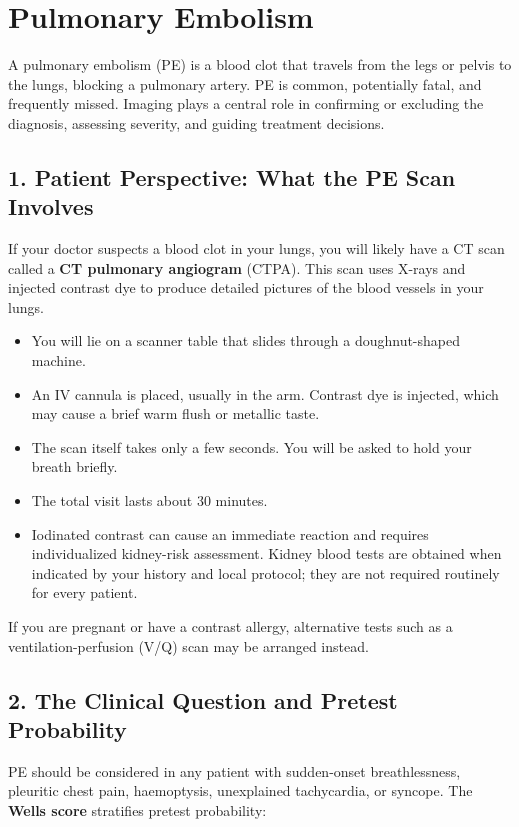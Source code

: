 \chapter{Pulmonary Embolism}

\label{ch:ch73_pulmonary_embolism}

A pulmonary embolism (PE) is a blood clot that travels from the legs or pelvis to the lungs, blocking a pulmonary artery. PE is common, potentially fatal, and frequently missed. Imaging plays a central role in confirming or excluding the diagnosis, assessing severity, and guiding treatment decisions.


\section{1. Patient Perspective: What the PE Scan Involves}

If your doctor suspects a blood clot in your lungs, you will likely have a CT scan called a \textbf{CT pulmonary angiogram} (CTPA). This scan uses X-rays and injected contrast dye to produce detailed pictures of the blood vessels in your lungs.

\begin{itemize}
  \item You will lie on a scanner table that slides through a doughnut-shaped machine.
  \item An IV cannula is placed, usually in the arm. Contrast dye is injected, which may cause a brief warm flush or metallic taste.
  \item The scan itself takes only a few seconds. You will be asked to hold your breath briefly.
  \item The total visit lasts about 30 minutes.
  \item Iodinated contrast can cause an immediate reaction and requires individualized kidney-risk assessment. Kidney blood tests are obtained when indicated by your history and local protocol; they are not required routinely for every patient.
\end{itemize}

If you are pregnant or have a contrast allergy, alternative tests such as a ventilation-perfusion (V/Q) scan may be arranged instead.


\section{2. The Clinical Question and Pretest Probability}

PE should be considered in any patient with sudden-onset breathlessness, pleuritic chest pain, haemoptysis, unexplained tachycardia, or syncope. The \textbf{Wells score} stratifies pretest probability:

